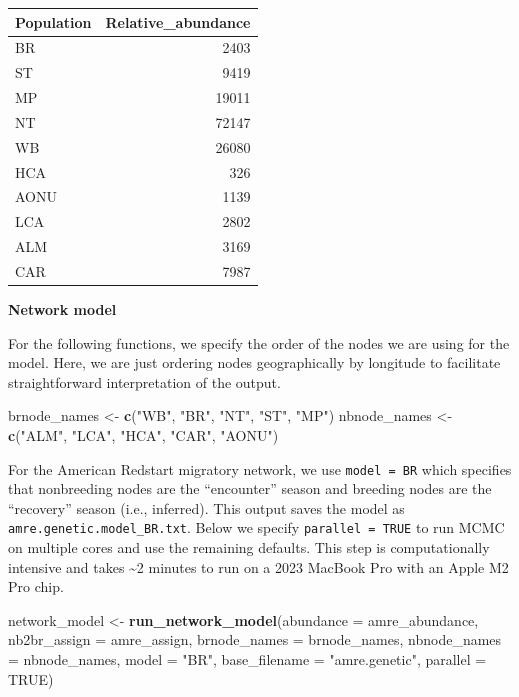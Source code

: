 \documentclass[
]{book}
\newenvironment{Shaded}{\begin{snugshade}}{\end{snugshade}}
\newcommand{\AttributeTok}[1]{\textcolor[rgb]{0.13,0.29,0.53}{#1}}
\newcommand{\ConstantTok}[1]{\textcolor[rgb]{0.56,0.35,0.01}{#1}}
\newcommand{\FunctionTok}[1]{\textcolor[rgb]{0.13,0.29,0.53}{\textbf{#1}}}
\newcommand{\NormalTok}[1]{#1}
\newcommand{\OtherTok}[1]{\textcolor[rgb]{0.56,0.35,0.01}{#1}}
\newcommand{\StringTok}[1]{\textcolor[rgb]{0.31,0.60,0.02}{#1}}
\begin{document}
\begin{tabular}{l|r}
\hline
Population & Relative\_abundance\\
\hline
BR & 2403\\
\hline
ST & 9419\\
\hline
MP & 19011\\
\hline
NT & 72147\\
\hline
WB & 26080\\
\hline
HCA & 326\\
\hline
AONU & 1139\\
\hline
LCA & 2802\\
\hline
ALM & 3169\\
\hline
CAR & 7987\\
\hline
\end{tabular}

\textbf{Network model}

For the following functions, we specify the order of the nodes we are using for the model. Here, we are just ordering nodes geographically by longitude to facilitate straightforward interpretation of the output.

\begin{Shaded}
\begin{Highlighting}[]
\NormalTok{brnode\_names }\OtherTok{\textless{}{-}} \FunctionTok{c}\NormalTok{(}\StringTok{"WB"}\NormalTok{, }\StringTok{"BR"}\NormalTok{, }\StringTok{"NT"}\NormalTok{, }\StringTok{"ST"}\NormalTok{, }\StringTok{"MP"}\NormalTok{)}
\NormalTok{nbnode\_names }\OtherTok{\textless{}{-}} \FunctionTok{c}\NormalTok{(}\StringTok{"ALM"}\NormalTok{, }\StringTok{"LCA"}\NormalTok{, }\StringTok{"HCA"}\NormalTok{, }\StringTok{"CAR"}\NormalTok{, }\StringTok{"AONU"}\NormalTok{)}
\end{Highlighting}
\end{Shaded}

For the American Redstart migratory network, we use \texttt{model\ =\ BR} which specifies that nonbreeding nodes are the ``encounter'' season and breeding nodes are the ``recovery'' season (i.e., inferred). This output saves the model as \texttt{amre.genetic.model\_BR.txt}. Below we specify \texttt{parallel\ =\ TRUE} to run MCMC on multiple cores and use the remaining defaults. This step is computationally intensive and takes \textasciitilde2 minutes to run on a 2023 MacBook Pro with an Apple M2 Pro chip.

\begin{Shaded}
\begin{Highlighting}[]
\NormalTok{network\_model }\OtherTok{\textless{}{-}} \FunctionTok{run\_network\_model}\NormalTok{(}\AttributeTok{abundance =}\NormalTok{ amre\_abundance, }
                           \AttributeTok{nb2br\_assign =}\NormalTok{ amre\_assign,}
                           \AttributeTok{brnode\_names =}\NormalTok{ brnode\_names, }
                           \AttributeTok{nbnode\_names =}\NormalTok{ nbnode\_names,}
                           \AttributeTok{model =} \StringTok{"BR"}\NormalTok{, }\AttributeTok{base\_filename =} \StringTok{"amre.genetic"}\NormalTok{,}
                           \AttributeTok{parallel =} \ConstantTok{TRUE}\NormalTok{)}
\end{Highlighting}
\end{Shaded}
\end{document}
